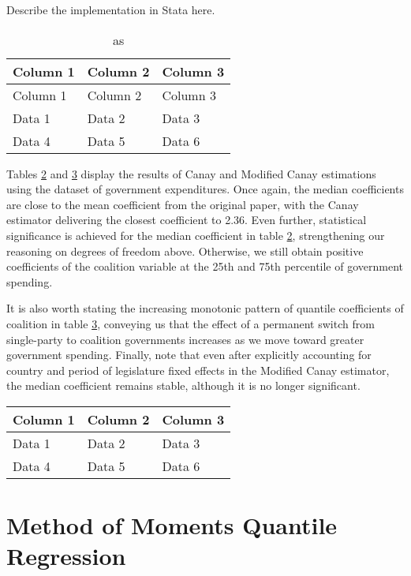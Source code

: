 \documentclass[bib]{statapress}
\begin{document}
Describe the implementation in Stata here.

\begin{longtable}[]{@{}lll@{}}
\caption{as}\tabularnewline
\toprule\noalign{}
Column 1 & Column 2 & Column 3 \\
\midrule\noalign{}
\endfirsthead
\toprule\noalign{}
Column 1 & Column 2 & Column 3 \\
\midrule\noalign{}
\endhead
\bottomrule\noalign{}
\endlastfoot
Data 1 & Data 2 & Data 3 \\
Data 4 & Data 5 & Data 6 \\
\end{longtable}

Tables \hyperref[tab:canay_results]{2} and
\hyperref[tab:mcanay_results]{3} display the results of Canay and
Modified Canay estimations using the \citep{persson2007} dataset of
government expenditures. Once again, the median coefficients are close
to the mean coefficient from the original paper, with the Canay
estimator delivering the closest coefficient to 2.36. Even further,
statistical significance is achieved for the median coefficient in table
\hyperref[tab:canay_results]{2}, strengthening our reasoning on degrees
of freedom above. Otherwise, we still obtain positive coefficients of
the coalition variable at the 25th and 75th percentile of government
spending.

It is also worth stating the increasing monotonic pattern of quantile
coefficients of coalition in table \hyperref[tab:mcanay_results]{3},
conveying us that the effect of a permanent switch from single-party to
coalition governments increases as we move toward greater government
spending. Finally, note that even after explicitly accounting for
country and period of legislature fixed effects in the Modified Canay
estimator, the median coefficient remains stable, although it is no
longer significant.

\begin{longtable}[]{@{}lll@{}}
\toprule\noalign{}
Column 1 & Column 2 & Column 3 \\
\midrule\noalign{}
\endhead
\bottomrule\noalign{}
\endlastfoot
Data 1 & Data 2 & Data 3 \\
Data 4 & Data 5 & Data 6 \\
\end{longtable}

\label{tab:mcanay_results}{}

\section{Method of Moments Quantile Regression}\label{sec:mmqreg}
\end{document}

